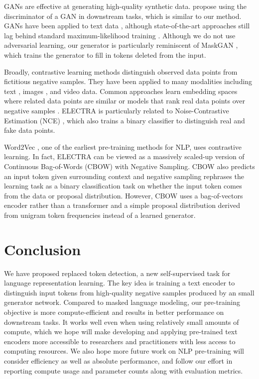 \documentclass{article}
\newcommand{\xhdr}[1]{\vspace{0mm}\noindent{{\bf #1}}\hspace{1.3mm}}
\begin{document}
\xhdr{Generative Adversarial Networks} GANs \citep{Goodfellow2014GenerativeAN} are effective at generating high-quality synthetic data. 
\citet{radford2015unsupervised} propose using the discriminator of a GAN in downstream tasks, which is similar to our method.
GANs have been applied to text data \citep{Yu2016SeqGANSG,zhang2017adversarial}, although state-of-the-art approaches still lag behind standard maximum-likelihood training \citep{Caccia2018LanguageGF, Tevet2018EvaluatingTG}.
Although we do not use adversarial learning, our generator is particularly reminiscent of MaskGAN \citep{Fedus2018MaskGANBT}, which trains the generator to fill in tokens deleted from the input.

\xhdr{Contrastive Learning} 
Broadly, contrastive learning methods distinguish observed data points from fictitious negative samples.  
They have been applied to many modalities including text \citep{Smith2005ContrastiveET}, images \citep{Chopra2005LearningAS}, and video \citep{Wang2015UnsupervisedLO,Sermanet2017TimeContrastiveNS} data. 
Common approaches learn embedding spaces where related data points are similar \citep{Saunshi2019ATA} or models that rank real data points over negative samples \citep{Collobert2011NaturalLP,Bordes2013TranslatingEF}. 
ELECTRA is particularly related to Noise-Contrastive Estimation (NCE) \citep{Gutmann2010NoisecontrastiveEA}, which also trains a binary classifier to distinguish real and fake data points.

Word2Vec \citep{Mikolov2013EfficientEO}, one of the earliest pre-training methods for NLP, uses contrastive learning.
In fact, ELECTRA can be viewed as a massively scaled-up version of Continuous Bag-of-Words (CBOW) with Negative Sampling.
CBOW also predicts an input token given surrounding context and negative sampling rephrases the learning task as a binary classification task on whether the input token comes from the data or proposal distribution.
However, CBOW uses a bag-of-vectors encoder rather than a transformer and a simple proposal distribution derived from unigram token frequencies instead of a learned generator.


\section{Conclusion}
We have proposed replaced token detection, a new self-supervised task for language representation learning. 
The key idea is training a text encoder to distinguish input tokens from high-quality negative samples produced by an small generator network.
Compared to masked language modeling, our pre-training objective is more compute-efficient and results in better performance on downstream tasks.
It works well even when using relatively small amounts of compute, which we hope will make developing and applying pre-trained text encoders more accessible to researchers and practitioners with less access to computing resources.
We also hope more future work on NLP pre-training will consider efficiency as well as absolute performance, and follow our effort in reporting compute usage and parameter counts along with evaluation metrics.
\end{document}
